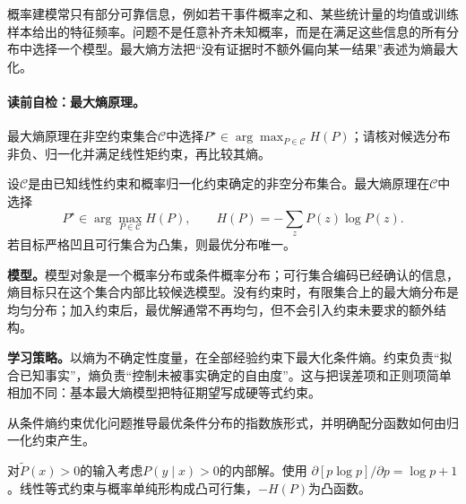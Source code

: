 \label{struct:V3-C01-CH06}
概率建模常只有部分可靠信息，例如若干事件概率之和、某些统计量的均值或训练样本给出的特征频率。问题不是任意补齐未知概率，而是在满足这些信息的所有分布中选择一个模型。最大熵方法把“没有证据时不额外偏向某一结果”表述为熵最大化。

\paragraph{读前自检：最大熵原理。}最大熵原理在非空约束集合$\mathcal C$中选择$P^\star\in\arg\max_{P\in\mathcal C}H(P)$；请核对候选分布非负、归一化并满足线性矩约束，再比较其熵。\par

\label{struct:V3-C01-CH07}
\begin{definition}[最大熵原理]\label{def:V3-C01-maxent-principle}
设$\mathcal C$是由已知线性约束和概率归一化约束确定的非空分布集合。最大熵原理在$\mathcal C$中选择
\[
P^\star\in\arg\max_{P\in\mathcal C}H(P),
\qquad H(P)=-\sum_zP(z)\log P(z).
\]
若目标严格凹且可行集合为凸集，则最优分布唯一。
\end{definition}

\label{struct:V3-C01-CH08}
\textbf{模型。}模型对象是一个概率分布或条件概率分布；可行集合编码已经确认的信息，熵目标只在这个集合内部比较候选模型。没有约束时，有限集合上的最大熵分布是均匀分布；加入约束后，最优解通常不再均匀，但不会引入约束未要求的额外结构。

\label{struct:V3-C01-CH09}
\textbf{学习策略。}以熵为不确定性度量，在全部经验约束下最大化条件熵。约束负责“拟合已知事实”，熵负责“控制未被事实确定的自由度”。这与把误差项和正则项简单相加不同：基本最大熵模型把特征期望写成硬等式约束。

\label{struct:V3-C01-CH11}

\begin{derivationgoalbox}
从条件熵约束优化问题推导最优条件分布的指数族形式，并明确配分函数如何由归一化约束产生。
\end{derivationgoalbox}
\begin{derivationprepbox}
对$\widetilde P(x)>0$的输入考虑$P(y\mid x)>0$的内部解。使用
$\partial[p\log p]/\partial p=\log p+1$。线性等式约束与概率单纯形构成凸可行集，$-H(P)$为凸函数。
\end{derivationprepbox}

